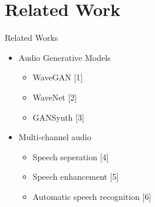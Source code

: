 \section{Related Work}
\begin{frame}{Related Works}
    \begin{itemize}
        \item Audio Generative Models
            \begin{itemize}
                \item WaveGAN [1]
                \item WaveNet [2]
                \item GANSynth [3]
            \end{itemize}
        \bigskip
        \bigskip
        \item Multi-channel audio
            \begin{itemize}
                \item Speech seperation [4]
                \item Speech enhancement [5]
                \item Automatic speech recognition [6]
            \end{itemize}
    \end{itemize}
\end{frame}